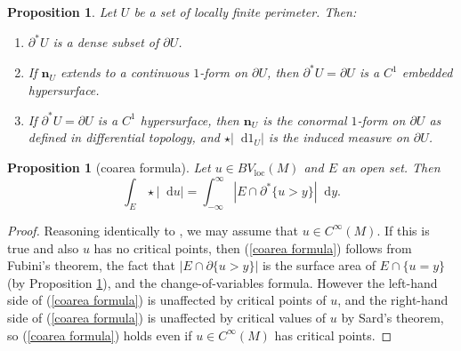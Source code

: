 \documentclass[final,12pt, leqno]{brownthesis}
\newcommand*\dif{\mathop{}\!\mathrm{d}}
\newcommand{\normal}{\mathbf n}
\newcommand{\loc}{\mathrm{loc}}
\newtheorem{proposition}[theorem]{Proposition}
\theoremstyle{definition}
\numberwithin{equation}{section}
\begin{document}
\begin{proposition}\label{locality of Caccioppoli}
    Let $U$ be a set of locally finite perimeter.
    Then:
    \begin{enumerate}
    \item $\partial^* U$ is a dense subset of $\partial U$.
    \item If $\normal_U$ extends to a continuous $1$-form on $\partial U$, then $\partial^* U = \partial U$ is a $C^1$ embedded hypersurface.
    \item If $\partial^* U = \partial U$ is a $C^1$ hypersurface, then $\normal_U$ is the conormal $1$-form on $\partial U$ as defined in differential topology, and $\star |\dif 1_U|$ is the induced measure on $\partial U$.
\end{enumerate}
\end{proposition}


\begin{proposition}[coarea formula]\label{Coarea2}
Let $u \in BV_\loc(M)$ and $E$ an open set. Then
\begin{equation}\label{coarea formula}
\int_E \star |\dif u| = \int_{-\infty}^\infty |E \cap \partial^* \{u > y\}| \dif y.
\end{equation}
\end{proposition}
\begin{proof}
Reasoning identically to \cite[Theorem 1.23]{Giusti77}, we may assume that $u \in C^\infty(M)$.
If this is true and also $u$ has no critical points, then (\ref{coarea formula}) follows from Fubini's theorem, the fact that $|E \cap \partial \{u > y\}|$ is the surface area of $E \cap \{u = y\}$ (by Proposition \ref{locality of Caccioppoli}), and the change-of-variables formula.
However the left-hand side of (\ref{coarea formula}) is unaffected by critical points of $u$, and the right-hand side of (\ref{coarea formula}) is unaffected by critical values of $u$ by Sard's theorem, so (\ref{coarea formula}) holds even if $u \in C^\infty(M)$ has critical points.
\end{proof}

\end{document}
